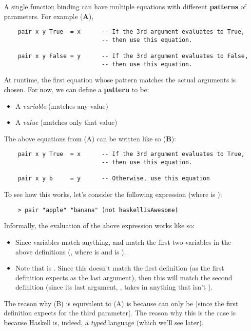 \documentclass[letterpaper]{article}
\begin{document}
A single function binding can have multiple equations with different \textbf{patterns} of parameters. For example (\textbf{A}),
\begin{verbatim}
    pair x y True  = x      -- If the 3rd argument evaluates to True,
                            -- then use this equation. 

    pair x y False = y      -- If the 3rd argument evaluates to False,
                            -- then use this equation. 
\end{verbatim}
At runtime, the first equation whose pattern matches the actual arguments is chosen. For now, we can define a \textbf{pattern} to be: 
\begin{itemize}
    \item A \emph{variable} (matches any value)
    \item A \emph{value} (matches only that value)
\end{itemize}
The above equations from (A) can be written like so (\textbf{B}): 
\begin{verbatim}
    pair x y True  = x      -- If the 3rd argument evaluates to True,
                            -- then use this equation. 

    pair x y b     = y      -- Otherwise, use this equation 
\end{verbatim}
To see how this works, let's consider the following expression (where  is ): 
\begin{verbatim}
    > pair "apple" "banana" (not haskellIsAwesome)
\end{verbatim}
Informally, the evaluation of the above expression works like so: 
\begin{itemize}
    \item Since variables match anything,  and  match the first two variables in the above definitions (, where  is  and  is ).
    \item Note that  is . Since this doesn't match the first definition (as the first definition expects  as the last argument), then this will match the second definition (since its last argument, , takes in anything that isn't ).
\end{itemize}
The reason why (B) is equivalent to (A) is because  can only be  (since the first definition expects  for the third parameter). The reason why this is the case is because Haskell is, indeed, a \emph{typed} language (which we'll see later).
\end{document}

